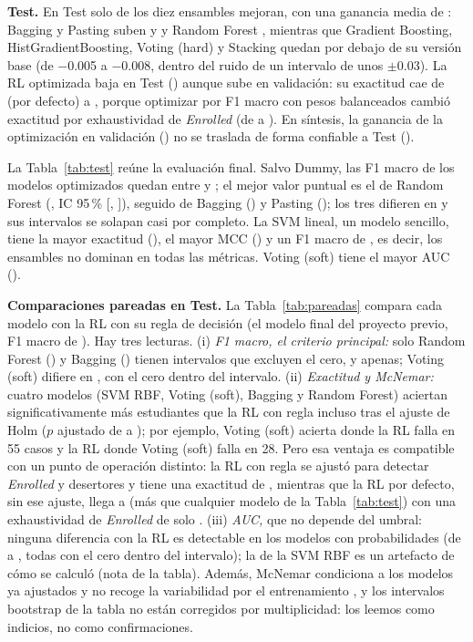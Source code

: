 \documentclass[conference]{IEEEtran}
\newcommand{\cE}{\emph{Enrolled}}
\newcommand{\Fm}{F1 macro}
\begin{document}
\textbf{Test.} En Test solo \nOptMejoraTest{} de los diez ensambles mejoran, con una ganancia media de \dteMedia{}: Bagging y Pasting suben \dteBAG{} y \dtePAS{} y Random Forest \dteRF{}, mientras que Gradient Boosting, HistGradientBoosting, Voting (hard) y Stacking quedan por debajo de su versión base (de $-$0.005 a $-$0.008, dentro del ruido de un intervalo de unos $\pm0.03$). La RL optimizada baja en Test (\dteLR{}) aunque sube en validación: su exactitud cae de \teAccLRD{} (por defecto) a \teAccLR{}, porque optimizar por \Fm{} con pesos balanceados cambió exactitud por exhaustividad de \cE{} (de \reELRD{} a \reELR). En síntesis, la ganancia de la optimización en validación (\dcvMedia{}) no se traslada de forma confiable a Test (\dteMedia{}).



La Tabla~\ref{tab:test} reúne la evaluación final. Salvo Dummy, las \Fm{} de los modelos optimizados quedan entre \testFMin{} y \testFMax{}; el mejor valor puntual es el de Random Forest (\teFRF, IC 95\,\% [\teLoRF, \teHiRF]), seguido de Bagging (\teFBAG) y Pasting (\teFPAS); los tres difieren en \rangoTresTest{} y sus intervalos se solapan casi por completo. La SVM lineal, un modelo sencillo, tiene la mayor exactitud (\teAccSVL), el mayor MCC (\teMccSVL) y un \Fm{} de \teFSVL{}, es decir, los ensambles no dominan en todas las métricas. Voting (soft) tiene el mayor AUC (\teAucVS).

\textbf{Comparaciones pareadas en Test.} La Tabla~\ref{tab:pareadas} compara cada modelo con la RL con su regla de decisión (el modelo final del proyecto previo, \Fm{} de \teFLRR{}). Hay tres lecturas. (i) \emph{\Fm{}, el criterio principal:} solo Random Forest (\parRF) y Bagging (\parBAG) tienen intervalos que excluyen el cero, y apenas; Voting (soft) difiere en \parVSF{}, con el cero dentro del intervalo. (ii) \emph{Exactitud y McNemar:} cuatro modelos (SVM RBF, Voting (soft), Bagging y Random Forest) aciertan significativamente más estudiantes que la RL con regla incluso tras el ajuste de Holm ($p$ ajustado de \phoSVR{} a \phoRF{}); por ejemplo, Voting (soft) acierta donde la RL falla en 55 casos y la RL donde Voting (soft) falla en 28. Pero esa ventaja es compatible con un punto de operación distinto: la RL con regla se ajustó para detectar \cE{} y desertores y tiene una exactitud de \teAccLRR{}, mientras que la RL por defecto, sin ese ajuste, llega a \accLRD{} (más que cualquier modelo de la Tabla~\ref{tab:test}) con una exhaustividad de \cE{} de solo \reELRD. (iii) \emph{AUC,} que no depende del umbral: ninguna diferencia con la RL es detectable en los modelos con probabilidades (de \auMin{} a \auMax{}, todas con el cero dentro del intervalo); la de la SVM RBF es un artefacto de cómo se calculó (nota de la tabla). Además, McNemar condiciona a los modelos ya ajustados y no recoge la variabilidad por el entrenamiento \cite{dietterich1998}, y los intervalos bootstrap de la tabla no están corregidos por multiplicidad: los leemos como indicios, no como confirmaciones.
\end{document}

